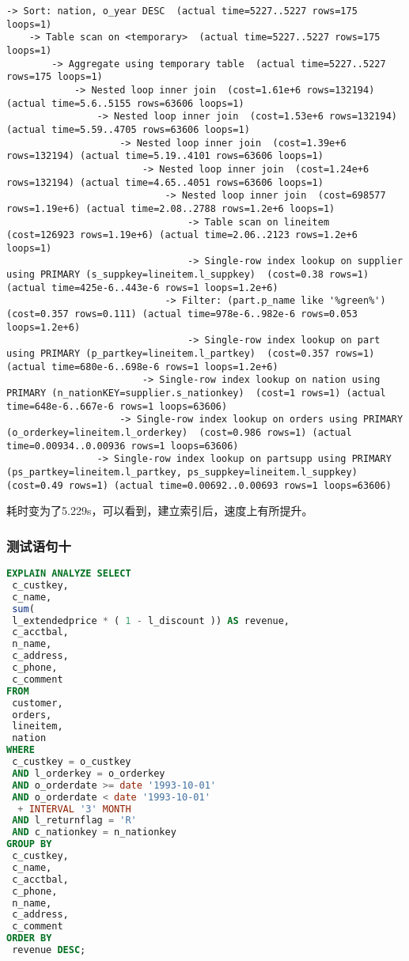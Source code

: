 \documentclass{article}
\begin{document}
\begin{lstlisting}
-> Sort: nation, o_year DESC  (actual time=5227..5227 rows=175 loops=1)
    -> Table scan on <temporary>  (actual time=5227..5227 rows=175 loops=1)
        -> Aggregate using temporary table  (actual time=5227..5227 rows=175 loops=1)
            -> Nested loop inner join  (cost=1.61e+6 rows=132194) (actual time=5.6..5155 rows=63606 loops=1)
                -> Nested loop inner join  (cost=1.53e+6 rows=132194) (actual time=5.59..4705 rows=63606 loops=1)
                    -> Nested loop inner join  (cost=1.39e+6 rows=132194) (actual time=5.19..4101 rows=63606 loops=1)
                        -> Nested loop inner join  (cost=1.24e+6 rows=132194) (actual time=4.65..4051 rows=63606 loops=1)
                            -> Nested loop inner join  (cost=698577 rows=1.19e+6) (actual time=2.08..2788 rows=1.2e+6 loops=1)
                                -> Table scan on lineitem  (cost=126923 rows=1.19e+6) (actual time=2.06..2123 rows=1.2e+6 loops=1)
                                -> Single-row index lookup on supplier using PRIMARY (s_suppkey=lineitem.l_suppkey)  (cost=0.38 rows=1) (actual time=425e-6..443e-6 rows=1 loops=1.2e+6)
                            -> Filter: (part.p_name like '%green%')  (cost=0.357 rows=0.111) (actual time=978e-6..982e-6 rows=0.053 loops=1.2e+6)
                                -> Single-row index lookup on part using PRIMARY (p_partkey=lineitem.l_partkey)  (cost=0.357 rows=1) (actual time=680e-6..698e-6 rows=1 loops=1.2e+6)
                        -> Single-row index lookup on nation using PRIMARY (n_nationKEY=supplier.s_nationkey)  (cost=1 rows=1) (actual time=648e-6..667e-6 rows=1 loops=63606)
                    -> Single-row index lookup on orders using PRIMARY (o_orderkey=lineitem.l_orderkey)  (cost=0.986 rows=1) (actual time=0.00934..0.00936 rows=1 loops=63606)
                -> Single-row index lookup on partsupp using PRIMARY (ps_partkey=lineitem.l_partkey, ps_suppkey=lineitem.l_suppkey)  (cost=0.49 rows=1) (actual time=0.00692..0.00693 rows=1 loops=63606)
\end{lstlisting}

耗时变为了5.229s，可以看到，建立索引后，速度上有所提升。

\subsubsection{测试语句十}

\begin{lstlisting}[language=sql]
EXPLAIN ANALYZE SELECT
 c_custkey,
 c_name,
 sum(
 l_extendedprice * ( 1 - l_discount )) AS revenue,
 c_acctbal,
 n_name,
 c_address,
 c_phone,
 c_comment 
FROM
 customer,
 orders,
 lineitem,
 nation 
WHERE
 c_custkey = o_custkey 
 AND l_orderkey = o_orderkey 
 AND o_orderdate >= date '1993-10-01' 
 AND o_orderdate < date '1993-10-01' 
  + INTERVAL '3' MONTH 
 AND l_returnflag = 'R' 
 AND c_nationkey = n_nationkey 
GROUP BY
 c_custkey,
 c_name,
 c_acctbal,
 c_phone,
 n_name,
 c_address,
 c_comment 
ORDER BY
 revenue DESC;
\end{lstlisting}
\end{document}
